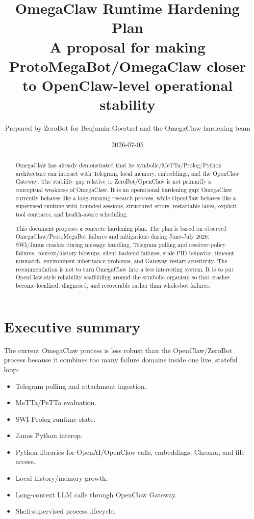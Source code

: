 \documentclass[11pt]{article}
\title{OmegaClaw Runtime Hardening Plan\\
\large A proposal for making ProtoMegaBot/OmegaClaw closer to OpenClaw-level operational stability}
\author{Prepared by ZeroBot for Benjamin Goertzel and the OmegaClaw hardening team}
\date{2026-07-05}
\begin{document}
\maketitle

\begin{abstract}
OmegaClaw has already demonstrated that its symbolic/MeTTa/Prolog/Python architecture can interact with Telegram, local memory, embeddings, and the OpenClaw Gateway. The stability gap relative to ZeroBot/OpenClaw is not primarily a conceptual weakness of OmegaClaw. It is an operational hardening gap: OmegaClaw currently behaves like a long-running research process, while OpenClaw behaves like a supervised runtime with bounded sessions, structured errors, restartable lanes, explicit tool contracts, and health-aware scheduling.

This document proposes a concrete hardening plan. The plan is based on observed OmegaClaw/ProtoMegaBot failures and mitigations during June-July 2026: SWI/Janus crashes during message handling, Telegram polling and resolver-policy failures, context/history blowups, silent backend failures, stale PID behavior, timeout mismatch, environment inheritance problems, and Gateway restart sensitivity. The recommendation is not to turn OmegaClaw into a less interesting system. It is to put OpenClaw-style reliability scaffolding around the symbolic organism so that crashes become localized, diagnosed, and recoverable rather than whole-bot failures.
\end{abstract}

\tableofcontents

\section{Executive summary}

The current OmegaClaw process is less robust than the OpenClaw/ZeroBot process because it combines too many failure domains inside one live, stateful loop:

\begin{itemize}
  \item Telegram polling and attachment ingestion.
  \item MeTTa/PeTTa evaluation.
  \item SWI-Prolog runtime state.
  \item Janus Python interop.
  \item Python libraries for OpenAI/OpenClaw calls, embeddings, Chroma, and file access.
  \item Local history/memory growth.
  \item Long-context LLM calls through OpenClaw Gateway.
  \item Shell-supervised process lifecycle.
\end{itemize}
\end{document}
